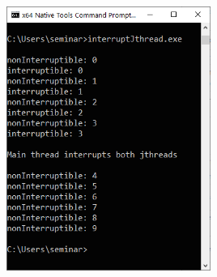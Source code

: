 \begin{center}
\includegraphics[width=0.5\textwidth]{content/3/chapter6/images/27.png}\\
\end{center}

\newpage

























